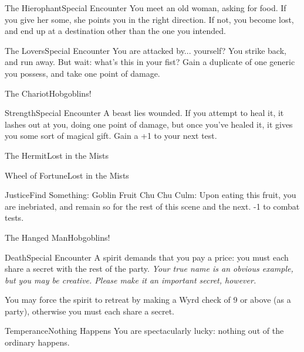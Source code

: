 \documentclass[green]{gl2018}
\begin{document}
\begin{location}{The Hierophant}{Special Encounter}
You meet an old woman, asking for food.  If you give her some, she points you in the right direction.  If not, you become lost, and end up at a destination other than the one you intended.
\end{location}
\begin{location}{The Lovers}{Special Encounter}
You are attacked by... yourself? You strike back, and run away. But wait: what's this in your fist? Gain a duplicate of one generic you possess, and take one point of damage.
\end{location}
\begin{location}{The Chariot}{Hobgoblins!}
\end{location}
\begin{location}{Strength}{Special Encounter}
A beast lies wounded.  If you attempt to heal it, it lashes out at you, doing one point of damage, but once you've healed it, it gives you some sort of magical gift.  Gain a +1 to your next test. 
\end{location}
\begin{location}{The Hermit}{Lost in the Mists}
\end{location}
\begin{location}{Wheel of Fortune}{Lost in the Mists}
\end{location}
\begin{location}{Justice}{Find Something: Goblin Fruit}
Chu Chu Culm: Upon eating this fruit, you are inebriated, and remain so for the rest of this scene and the next.  -1 to combat tests.
\end{location}
\begin{location}{The Hanged Man}{Hobgoblins!}
\end{location}
\begin{location}{Death}{Special Encounter}
A spirit demands that you pay a price: you must each share a secret with the rest of the party.  {\em Your true name is an obvious example, but you may be creative.  Please make it an important secret, however.}

You may force the spirit to retreat by making a Wyrd check of 9 or above (as a party), otherwise you must each share a secret.
\end{location}
\begin{location}{Temperance}{Nothing Happens}
You are spectacularly lucky: nothing out of the ordinary happens.
\end{location}
\end{document}
